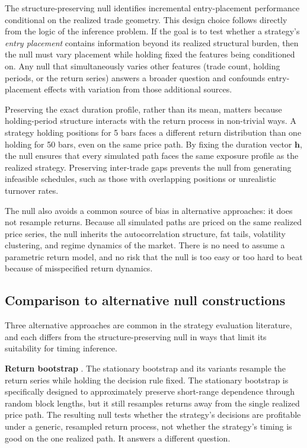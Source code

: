 \documentclass[preprint,12pt]{elsarticle}
\theoremstyle{definition}
\begin{document}
The structure-preserving null identifies incremental entry-placement performance conditional on the realized trade geometry. This design choice follows directly from the logic of the inference problem. If the goal is to test whether a strategy's \emph{entry placement} contains information beyond its realized structural burden, then the null must vary placement while holding fixed the features being conditioned on. Any null that simultaneously varies other features (trade count, holding periods, or the return series) answers a broader question and confounds entry-placement effects with variation from those additional sources.

Preserving the exact duration profile, rather than its mean, matters because holding-period structure interacts with the return process in non-trivial ways. A strategy holding positions for 5 bars faces a different return distribution than one holding for 50 bars, even on the same price path. By fixing the duration vector $\mathbf{h}$, the null ensures that every simulated path faces the same exposure profile as the realized strategy. Preserving inter-trade gaps prevents the null from generating infeasible schedules, such as those with overlapping positions or unrealistic turnover rates.

The null also avoids a common source of bias in alternative approaches: it does not resample returns. Because all simulated paths are priced on the same realized price series, the null inherits the autocorrelation structure, fat tails, volatility clustering, and regime dynamics of the market. There is no need to assume a parametric return model, and no risk that the null is too easy or too hard to beat because of misspecified return dynamics.

\subsection{Comparison to alternative null constructions}

Three alternative approaches are common in the strategy evaluation literature, and each differs from the structure-preserving null in ways that limit its suitability for timing inference.

\textbf{Return bootstrap} \cite{politisromano1994}. The stationary bootstrap and its variants resample the return series while holding the decision rule fixed. The stationary bootstrap is specifically designed to approximately preserve short-range dependence through random block lengths, but it still resamples returns away from the single realized price path. The resulting null tests whether the strategy's decisions are profitable under a generic, resampled return process, not whether the strategy's timing is good on the one realized path. It answers a different question.
\end{document}
